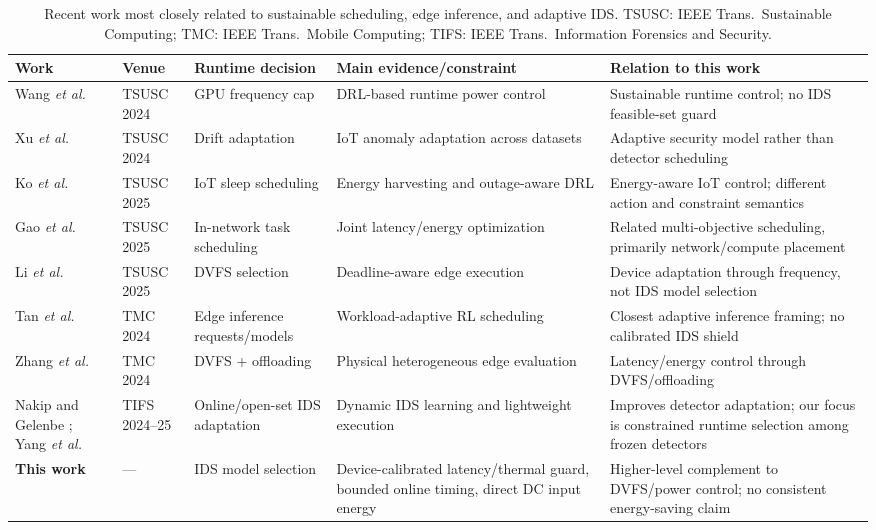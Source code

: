 \documentclass[journal]{IEEEtran}
\begin{document}
\begin{table}[t]
\caption{Recent work most closely related to sustainable scheduling, edge inference, and adaptive IDS. TSUSC: IEEE Trans.\ Sustainable Computing; TMC: IEEE Trans.\ Mobile Computing; TIFS: IEEE Trans.\ Information Forensics and Security.}
\label{tab:recentwork}
\centering\scriptsize
\begin{tabularx}{\textwidth}{@{}L{2.6cm}L{1.55cm}L{2.75cm}L{3.75cm}>{\raggedright\arraybackslash}X@{}}
\toprule
Work & Venue & Runtime decision & Main evidence/constraint & Relation to this work \\
\midrule
Wang \emph{et al.} \cite{wang2024drlcap} & TSUSC 2024 & GPU frequency cap & DRL-based runtime power control & Sustainable runtime control; no IDS feasible-set guard \\
Xu \emph{et al.} \cite{xu2024conceptdrift} & TSUSC 2024 & Drift adaptation & IoT anomaly adaptation across datasets & Adaptive security model rather than detector scheduling \\
Ko \emph{et al.} \cite{ko2025rass} & TSUSC 2025 & IoT sleep scheduling & Energy harvesting and outage-aware DRL & Energy-aware IoT control; different action and constraint semantics \\
Gao \emph{et al.} \cite{gao2025inc} & TSUSC 2025 & In-network task scheduling & Joint latency/energy optimization & Related multi-objective scheduling, primarily network/compute placement \\
Li \emph{et al.} \cite{li2025dvfsedge} & TSUSC 2025 & DVFS selection & Deadline-aware edge execution & Device adaptation through frequency, not IDS model selection \\
Tan \emph{et al.} \cite{tan2024workloadadaptive} & TMC 2024 & Edge inference requests/models & Workload-adaptive RL scheduling & Closest adaptive inference framing; no calibrated IDS shield \\
Zhang \emph{et al.} \cite{zhang2024dvfo} & TMC 2024 & DVFS + offloading & Physical heterogeneous edge evaluation & Latency/energy control through DVFS/offloading \\
Nakip and Gelenbe \cite{nakip2024selfsupervised}; Yang \emph{et al.} \cite{yang2025openset} & TIFS 2024--25 & Online/open-set IDS adaptation & Dynamic IDS learning and lightweight execution & Improves detector adaptation; our focus is constrained runtime selection among frozen detectors \\
\textbf{This work} & --- & IDS model selection & Device-calibrated latency/thermal guard, bounded online timing, direct DC input energy & Higher-level complement to DVFS/power control; no consistent energy-saving claim \\
\bottomrule
\end{tabularx}
\end{table}
\end{document}

